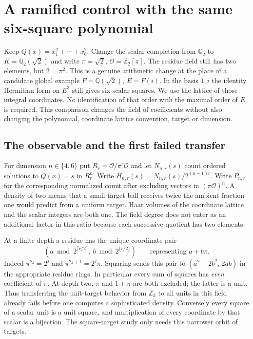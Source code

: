 \documentclass[12pt,letterpaper]{article}
\begin{document}
\section{A ramified control with the same six-square polynomial}\label{sec:ramified}
Keep $Q(x)=x_1^2+\cdots+x_6^2$. Change the scalar completion from $\mathbb Q_2$ to $K=\mathbb Q_2(\sqrt 2)$ and write $\pi=\sqrt2$, $\mathcal O=\mathbb Z_2[\pi]$. The residue field still has two elements, but $2=\pi^2$. This is a genuine arithmetic change at the place of a candidate global example $F=\mathbb Q(\sqrt2)$, $E=F(i)$. In the basis $1,i$ the identity Hermitian form on $E^3$ still gives six scalar squares. We use the lattice of those integral coordinates. No identification of that order with the maximal order of $E$ is required. This comparison changes the field of coefficients without also changing the polynomial, coordinate lattice convention, target or dimension.

\subsection{The observable and the first failed transfer}
For dimension $n\in\{4,6\}$ put $R_r=\mathcal O/\pi^r\mathcal O$ and let $N_{n,r}(s)$ count ordered solutions to $Q(x)=s$ in $R_r^n$. Write $H_{n,r}(s)=N_{n,r}(s)/2^{(n-1)r}$. Write $P_{n,r}$ for the corresponding normalized count after excluding vectors in $(\pi\mathcal O)^n$. A density of two means that a small target ball receives twice the ambient fraction one would predict from a uniform target. Haar volumes of the coordinate lattice and the scalar integers are both one. The field degree does not enter as an additional factor in this ratio because each successive quotient has two elements.

At a finite depth a residue has the unique coordinate pair
\[
 (a\bmod 2^{\lceil r/2\rceil},\ b\bmod 2^{\lfloor r/2\rfloor})
           \qquad\text{representing }a+b\pi .
\]
Indeed $\pi^{2j}=2^j$ and $\pi^{2j+1}=2^j\pi$. Squaring sends this pair to $(a^2+2b^2,\,2ab)$ in the appropriate residue rings. In particular every sum of squares has \emph{even} coefficient of $\pi$. At depth two, $\pi$ and $1+\pi$ are both excluded; the latter is a unit. Thus transferring the unit-target behavior from $\mathbb Z_2$ to all units in this field already fails before one computes a sophisticated density. Conversely every square of a scalar unit is a unit square, and multiplication of every coordinate by that scalar is a bijection. The square-target study only needs this narrower orbit of targets.
\end{document}
